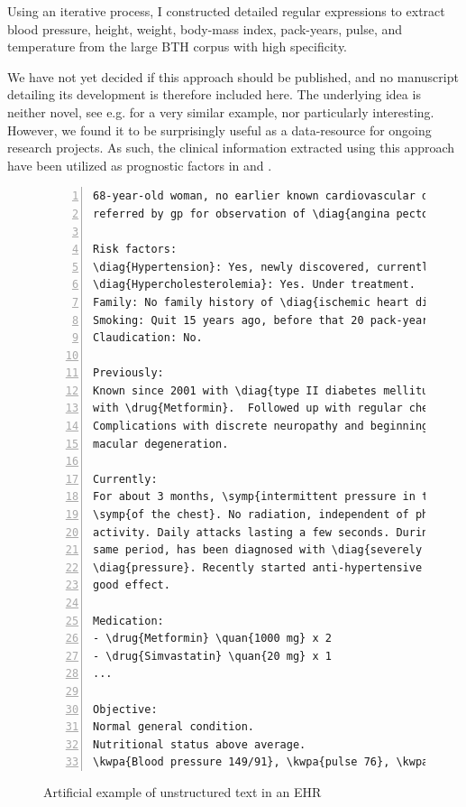 Using an iterative process, 
I constructed detailed regular expressions to 
extract blood pressure, height, weight, body-mass index, pack-years,
pulse, and temperature from the large \ac{BTH} corpus 
with high specificity.

We have not yet decided if this approach should be published,
and no manuscript detailing its development is therefore included here.
The underlying idea is neither novel,
see e.g. \textcite{turchinUsing2006} for a very similar example,
nor particularly interesting.
However, we found it to be surprisingly useful as a data-resource
for ongoing research projects.
As such, the clinical information extracted using this approach
have been utilized as prognostic factors in \studyii{} and \studyiii{}.

\begin{figure}
{%
\newcommand{\diag}[1]{\cbox{color3!60!white}{#1}}
\newcommand{\symp}[1]{\cbox{color4!60!white}{#1}}
\newcommand{\drug}[1]{\cbox{color5!60!white}{#1}}
\newcommand{\quan}[1]{\cbox{color6!60!white}{#1}}
\newcommand{\kwpa}[1]{\cbox{color7!60!white}{#1}}

\begin{Verbatim}[commandchars=\\\{\}, fontsize=\scriptsize, 
    frame=single, framesep=1em, numbers=left, numbersep=3pt]
68-year-old woman, no earlier known cardiovascular disease, 
referred by gp for observation of \diag{angina pectoris}.

Risk factors:
\diag{Hypertension}: Yes, newly discovered, currently well-treated.
\diag{Hypercholesterolemia}: Yes. Under treatment.
Family: No family history of \diag{ischemic heart disease}.
Smoking: Quit 15 years ago, before that 20 pack-years.
Claudication: No.

Previously:
Known since 2001 with \diag{type II diabetes mellitus}, treated 
with \drug{Metformin}.  Followed up with regular checks. 
Complications with discrete neuropathy and beginning 
macular degeneration.

Currently:
For about 3 months, \symp{intermittent pressure in the left side}
\symp{of the chest}. No radiation, independent of physical 
activity. Daily attacks lasting a few seconds. During the 
same period, has been diagnosed with \diag{severely elevated blood}
\diag{pressure}. Recently started anti-hypertensive treatment with
good effect.

Medication:
- \drug{Metformin} \quan{1000 mg} x 2
- \drug{Simvastatin} \quan{20 mg} x 1
...

Objective:
Normal general condition.
Nutritional status above average.
\kwpa{Blood pressure 149/91}, \kwpa{pulse 76}, \kwpa{height 177 cm}, \kwpa{weight 96 kg}
\end{Verbatim}
\caption{Artificial example of unstructured text in an \ac{EHR}}
\label{fig:notes-example}
}
\end{figure}%

